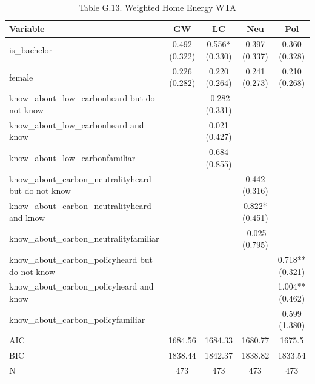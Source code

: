 \begin{table}[!htbp]
\centering
\caption{Table G.13. Weighted Home Energy WTA}
\begin{tabular}{lcccc}
\hline
Variable & GW & LC & Neu & Pol \\
\hline
is\_bachelor & 0.492 (0.322) & 0.556* (0.330) & 0.397 (0.337) & 0.360 (0.328) \\
female & 0.226 (0.282) & 0.220 (0.264) & 0.241 (0.273) & 0.210 (0.268) \\
know\_about\_low\_carbonheard but do not know &  & -0.282 (0.331) &  &  \\
know\_about\_low\_carbonheard and know &  & 0.021 (0.427) &  &  \\
know\_about\_low\_carbonfamiliar &  & 0.684 (0.855) &  &  \\
know\_about\_carbon\_neutralityheard but do not know &  &  & 0.442 (0.316) &  \\
know\_about\_carbon\_neutralityheard and know &  &  & 0.822* (0.451) &  \\
know\_about\_carbon\_neutralityfamiliar &  &  & -0.025 (0.795) &  \\
know\_about\_carbon\_policyheard but do not know &  &  &  & 0.718** (0.321) \\
know\_about\_carbon\_policyheard and know &  &  &  & 1.004** (0.462) \\
know\_about\_carbon\_policyfamiliar &  &  &  & 0.599 (1.380) \\
AIC & 1684.56 & 1684.33 & 1680.77 & 1675.5 \\
BIC & 1838.44 & 1842.37 & 1838.82 & 1833.54 \\
N & 473 & 473 & 473 & 473 \\
\hline
\end{tabular}
\end{table}
